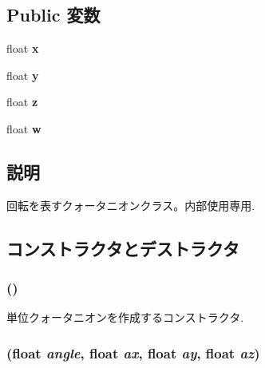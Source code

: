 \subsection*{Public 変数}
\begin{CompactItemize}
\item 
\hypertarget{classm3g_1_1Quaternion_d0da36b2558901e21e7a30f6c227a45e}{
float \textbf{x}}
\label{classm3g_1_1Quaternion_d0da36b2558901e21e7a30f6c227a45e}

\item 
\hypertarget{classm3g_1_1Quaternion_a4f0d3eebc3c443f9be81bf48561a217}{
float \textbf{y}}
\label{classm3g_1_1Quaternion_a4f0d3eebc3c443f9be81bf48561a217}

\item 
\hypertarget{classm3g_1_1Quaternion_f73583b1e980b0aa03f9884812e9fd4d}{
float \textbf{z}}
\label{classm3g_1_1Quaternion_f73583b1e980b0aa03f9884812e9fd4d}

\item 
\hypertarget{classm3g_1_1Quaternion_56eca241e2896b9f57a79589e76fd24b}{
float \textbf{w}}
\label{classm3g_1_1Quaternion_56eca241e2896b9f57a79589e76fd24b}

\end{CompactItemize}


\subsection{説明}
回転を表すクォータニオンクラス。内部使用専用. 

\subsection{コンストラクタとデストラクタ}
\hypertarget{classm3g_1_1Quaternion_65ed15cc19af958b5933b5c522f10e66}{
\subsubsection[{Quaternion}]{ ()}}
\label{classm3g_1_1Quaternion_65ed15cc19af958b5933b5c522f10e66}


単位クォータニオンを作成するコンストラクタ. \hypertarget{classm3g_1_1Quaternion_7a06a28b864e525f73a1bb0eb3e9274e}{
\subsubsection[{Quaternion}]{ (float {\em angle}, \/  float {\em ax}, \/  float {\em ay}, \/  float {\em az})}}
\label{classm3g_1_1Quaternion_7a06a28b864e525f73a1bb0eb3e9274e}


